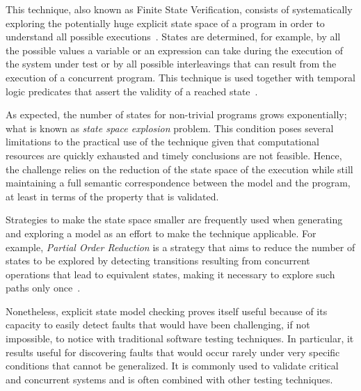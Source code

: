 
\label{subsec:explicit-state-model-checking}

This technique, also known as Finite State Verification, consists of systematically exploring the potentially huge explicit state space of a program in order to understand all possible executions~\cite{Clarke2000}. States are determined, for example, by all the possible values a variable or an expression can take during the execution of the system under test or by all possible interleavings that can result from the execution of a concurrent program. This technique is used together with temporal logic predicates that assert the validity of a reached state~\cite{Pnueli1977}. 

As expected, the number of states for non-trivial programs grows exponentially; what is known as \textit{state space explosion} problem. This condition poses several limitations to the practical use of the technique given that computational resources are quickly exhausted and timely conclusions are not feasible. Hence, the challenge relies on the reduction of the state space of the execution while still maintaining a full semantic correspondence between the model and the program, at least in terms of the property that is validated.

Strategies to make the state space smaller are frequently used when generating and exploring a model as an effort to make the technique applicable. For example, \textit{Partial Order Reduction} is a strategy that aims to reduce the number of states to be explored by detecting transitions resulting from concurrent operations that lead to equivalent states, making it necessary to explore such paths only once~\cite{Godefroid1996,Peled1993,Valmari1991}. 

Nonetheless, explicit state model checking proves itself useful because of its capacity to easily detect faults that would have been challenging, if not impossible, to notice with traditional software testing techniques. In particular, it results useful for discovering faults that would occur rarely under very specific conditions that cannot be generalized. It is commonly used to validate critical and concurrent systems and is often combined with other testing techniques.


